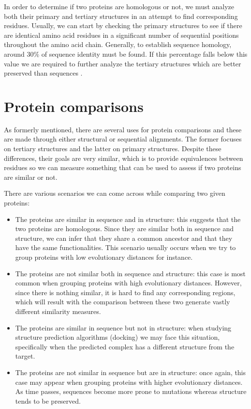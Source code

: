 In order to determine if two proteins are homologous or not, we must analyze both their primary and tertiary structures in an attempt to find corresponding residues. Usually, we can start by checking the primary structures to see if there are identical amino acid residues in a significant number of sequential positions throughout the amino acid chain. Generally, to establish sequence homology, around $30\%$ of sequence identity must be found. If this percentage falls below this value we are required to further analyze the tertiary structures which are better preserved than sequences \cite{pearson2013introduction}. 

\section{Protein comparisons} 

As formerly mentioned, there are several uses for protein comparisons and these are made through either structural or sequential alignments. The former focuses on tertiary structures and the latter on primary structures. Despite these differences, their goals are very similar, which is to provide equivalences between residues so we can measure something that can be used to assess if two proteins are similar or not.

There are various scenarios we can come across while comparing two given proteins:
\begin{itemize}
	\item The proteins are similar in sequence and in structure: this suggests that the two proteins are homologous. Since they are similar both in sequence and structure, we can infer that they share a common ancestor and that they have the same functionalities. This scenario usually occurs when we try to group proteins with low evolutionary distances for instance. 
	
	\item The proteins are not similar both in sequence and structure: this case is most common when grouping proteins with high evolutionary distances. However, since there is nothing similar, it is hard to find any corresponding regions, which will result with the comparison between these two generate vastly different similarity measures.
		
	\item The proteins are similar in sequence but not in structure: when studying structure prediction algorithms (docking) we may face this situation, specifically when the predicted complex has a different structure from the target.
	
	\item The proteins are not similar in sequence but are in structure: once again, this case may appear when grouping proteins with higher evolutionary distances. As time passes, sequences become more prone to mutations whereas structure tends to be preserved. 
\end{itemize}

